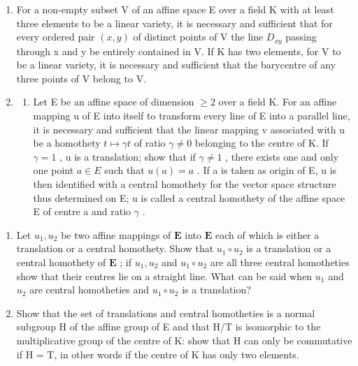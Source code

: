 \begin{enumerate}
\def\labelenumi{\arabic{enumi}.}
\setcounter{enumi}{4}
\item
  For a non-empty subset V of an affine space E over a field K with at least three elements to be a linear variety, it is necessary and sufficient that for every ordered pair \((x,y)\) of distinct points of V the line \(D_{xy}\) passing through x and y be entirely contained in V. If K has two elements, for V to be a linear variety, it is necessary and sufficient that the barycentre of any three points of V belong to V.
\item
  \begin{enumerate}
  \def\labelenumii{(\alph{enumii})}
  \tightlist
  \item
    Let E be an affine space of dimension \(\geqslant2\) over a field K. For an affine mapping u of E into itself to transform every line of E into a parallel line, it is necessary and sufficient that the linear mapping v associated with u be a homothety \(t\mapsto\gamma t\) of ratio \(\gamma\neq0\) belonging to the centre of K. If \(\gamma=1\) , u is a translation; show that if \(\gamma\neq1\) , there exists one and only one point \(a\in E\) such that \(u(a)=a\) . If a is taken as origin of E, u is then identified with a central homothety for the vector space structure thus determined on E; u is called a central homothety of the affine space E of centre a and ratio \(\gamma\) .
  \end{enumerate}
\end{enumerate}

\begin{enumerate}
\def\labelenumi{(\alph{enumi})}
\setcounter{enumi}{1}
\item
  Let \(u_1, u_2\) be two affine mappings of \(\mathbf{E}\) into \(\mathbf{E}\) each of which is either a translation or a central homothety. Show that \(u_1 \circ u_2\) is a translation or a central homothety of \(\mathbf{E}\) ; if \(u_1, u_2\) and \(u_1 \circ u_2\) are all three central homotheties show that their centres lie on a straight line. What can be said when \(u_1\) and \(u_2\) are central homotheties and \(u_1 \circ u_2\) is a translation?
\item
  Show that the set of translations and central homotheties is a normal subgroup H of the affine group of E and that H/T is isomorphic to the multiplicative group of the centre of K: show that H can only be commutative if H = T, in other words if the centre of K has only two elements.
\end{enumerate}

